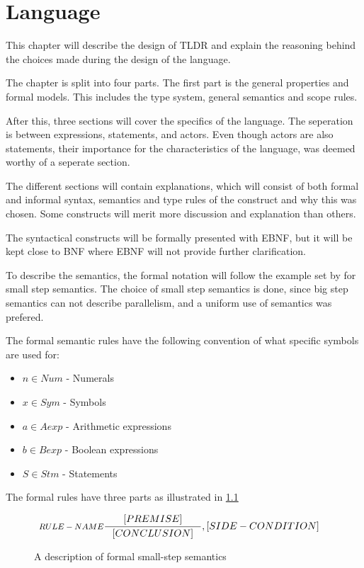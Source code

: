 \chapter{Language}\label{part:design}

This chapter will describe the design of TLDR and explain the reasoning behind the choices made during the design of the language.

The chapter is split into four parts. The first part is the general properties and formal models. This includes the type system, general semantics and scope rules.

After this, three sections will cover the specifics of the language. The seperation is between expressions, statements, and actors. Even though actors are also statements, their importance for the characteristics of the language, was deemed worthy of a seperate section.

The different sections will contain explanations, which will consist of both formal and informal syntax, semantics and type rules of the construct and why this was chosen. Some constructs will merit more discussion and explanation than others.

The syntactical constructs will be formally presented with EBNF, but it will be kept close to BNF where EBNF will not provide further clarification. 

To describe the semantics, the formal notation will follow the example set by \cite{huttel2010transitions} for small step semantics. The choice of small step semantics is done, since big step semantics can not describe parallelism, and a uniform use of semantics was prefered.

The formal semantic rules have the following convention of what specific symbols are used for:
\begin{itemize}
	\item $n \in Num$ - Numerals
	\item $x \in Sym$ - Symbols
	\item $a \in Aexp$ - Arithmetic expressions
	\item $b \in Bexp$ - Boolean expressions
	\item $S \in Stm$ - Statements	
\end{itemize}

The formal rules have three parts as illustrated in \cref{SS-semantics}

\begin{figure}[H]
\begin{align*}
&\inference[$RULE-NAME$]{[PREMISE]}
                        {[CONCLUSION]}
                        {,[SIDE-CONDITION]}
\end{align*}
\caption{A description of formal small-step semantics}
\label{SS-semantics}
\end{figure}

